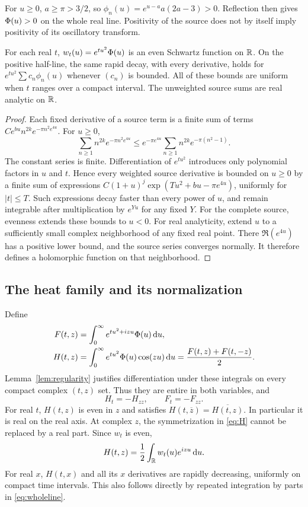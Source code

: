 For $u\ge0$, $a\ge\pi>3/2$, so
$\phi_n(u)=e^{u-a}a(2a-3)>0$. Reflection then gives
$\Phi(u)>0$ on the whole real line. Positivity of the source does not
by itself imply positivity of its oscillatory transform.

\begin{lemma}\label{lem:regularity}
For each real $t$, $w_t(u)=e^{tu^2}\Phi(u)$ is an even Schwartz function on
$\mathbb R$. On the positive half-line, the same rapid decay, with every derivative,
holds for $e^{tu^2}\sum c_n\phi_n(u)$ whenever $(c_n)$ is bounded. All of
these bounds are uniform when $t$ ranges over a compact interval. The
unweighted source sums are real analytic on $\mathbb R$.
\end{lemma}
\begin{proof}
Each fixed derivative of a source term is a finite sum of terms
$C e^{bu}n^{2k}e^{-\pi n^2e^{4u}}$. For $u\ge0$,
\[
 \sum_{n\ge1}n^{2k}e^{-\pi n^2e^{4u}}
 \le e^{-\pi e^{4u}}
       \sum_{n\ge1}n^{2k}e^{-\pi(n^2-1)}.
\]
The constant series is finite. Differentiation of $e^{tu^2}$ introduces
only polynomial factors in $u$ and $t$. Hence every weighted source
derivative is bounded on $u\ge0$ by a finite sum of expressions
$C(1+u)^j\exp(Tu^2+bu-\pi e^{4u})$, uniformly for $|t|\le T$.
Such expressions decay faster than every power of $u$, and remain
integrable after multiplication by $e^{Yu}$ for any fixed $Y$.
For the complete source, evenness extends these bounds to $u<0$.
For real analyticity, extend $u$ to a sufficiently small complex
neighborhood of any fixed real point. There $\Re(e^{4u})$ has a positive
lower bound, and the source series converges normally. It therefore defines
a holomorphic function on that neighborhood.
\end{proof}

\subsection{The heat family and its normalization}

Define
\begin{align}
 F(t,z)&=\int_0^\infty e^{tu^2+izu}\Phi(u)\,\mathrm d u,\label{eq:F}\\
 H(t,z)&=\int_0^\infty e^{tu^2}\Phi(u)\cos(zu)\,\mathrm d u
       =\frac{F(t,z)+F(t,-z)}2.\label{eq:H}
\end{align}
Lemma~\ref{lem:regularity} justifies differentiation under these integrals
on every compact complex $(t,z)$ set. Thus they are entire in both variables,
and
\begin{equation}\label{eq:heat}
 H_t=-H_{zz},\qquad F_t=-F_{zz}.
\end{equation}
For real $t$, $H(t,z)$ is even in $z$ and satisfies
$H(t,\overline z)=\overline{H(t,z)}$. In particular it is real on the real
axis. At complex $z$, the symmetrization in \eqref{eq:H} cannot be replaced
by a real part. Since $w_t$ is even,
\begin{equation}\label{eq:wholeline}
 H(t,z)=\frac12\int_\mathbb R w_t(u)e^{izu}\,\mathrm d u.
\end{equation}
For real $x$, $H(t,x)$ and all its $x$ derivatives are rapidly decreasing,
uniformly on compact time intervals. This also follows directly by repeated
integration by parts in \eqref{eq:wholeline}.

